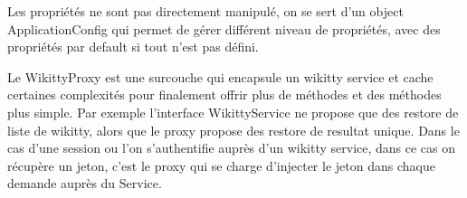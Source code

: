 Les propriétés ne sont pas directement manipulé, on se sert d'un object 
ApplicationConfig qui permet de gérer différent niveau de propriétés,
avec des propriétés par default si tout n'est pas défini.

Le WikittyProxy est une surcouche qui encapsule un wikitty service et cache 
certaines complexités pour finalement offrir plus de méthodes et des méthodes 
plus simple. Par exemple l'interface WikittyService ne propose que des 
restore de liste de wikitty, alors que le proxy propose des restore de resultat
unique. Dans le cas d'une session ou l'on s'authentifie auprès d'un wikitty 
service, dans ce cas on récupère un jeton, c'est le proxy qui se charge 
d'injecter le jeton dans chaque demande auprès du Service.

